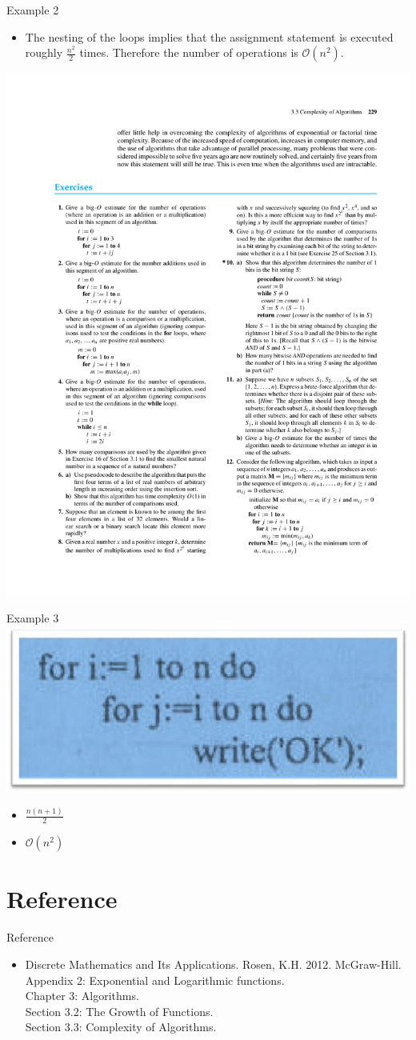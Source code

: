 \documentclass{beamer}
\theoremstyle{definition}
\begin{document}
\begin{frame}{Example 2}
    \begin{itemize}
     \item The nesting of the loops implies that the assignment statement is executed roughly $\frac{n^2}{2}$ times. Therefore the number of operations is $\mathcal{O}(n^2)$.

    \end{itemize}

    \centering \includegraphics[trim={3cm 11.7cm 14.3cm 14.5cm},clip,width=0.45\linewidth]{p229}
\end{frame}

\begin{frame}{Example 3}
    \centering \includegraphics[width=0.45\linewidth]{code}
    \begin{itemize}
     \item $\frac{n(n+1)}{2}$
     \item $\mathcal{O}(n^2)$
    \end{itemize}
\end{frame}

\section*{Reference}

\begin{frame}{Reference}
    \begin{itemize}
        \item Discrete Mathematics and Its Applications. Rosen, K.H. 2012. McGraw-Hill. \\
        Appendix 2: Exponential and Logarithmic functions. \\
        Chapter 3: Algorithms. \\
        Section 3.2: The Growth of Functions. \\
        Section 3.3: Complexity of Algorithms.
    \end{itemize}
\end{frame}
\end{document}
